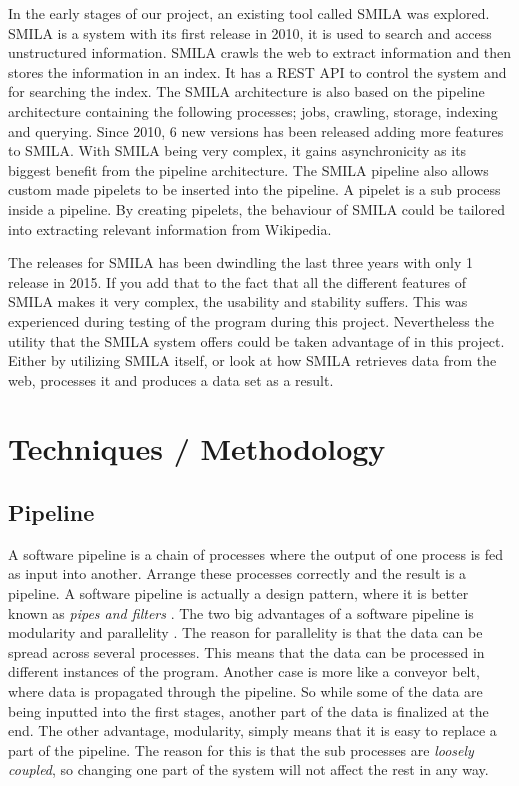 In the early stages of our project, an existing tool called SMILA \cite{smila} was explored. SMILA is a system with its first release in 2010, it is used to search and access unstructured information. SMILA crawls the web to extract information and then stores the information in an index. It has a REST API to control the system and for searching the index. The SMILA architecture is also based on the pipeline architecture containing the following processes; jobs, crawling, storage, indexing and querying. Since 2010, 6 new versions has been released adding more features to SMILA. With SMILA being very complex, it gains asynchronicity as its biggest benefit from the pipeline architecture. The SMILA pipeline also allows custom made pipelets to be inserted into the pipeline. A pipelet is a sub process inside a pipeline. By creating pipelets, the behaviour of SMILA could be tailored into extracting relevant information from Wikipedia.

The releases for SMILA has been dwindling the last three years with only 1 release in 2015. If you add that to the fact that all the different features of SMILA makes it very complex, the usability and stability suffers. This was experienced during testing of the program during this project.
Nevertheless the utility that the SMILA system offers could be taken advantage of in this project. Either by utilizing SMILA itself, or look at how SMILA retrieves data from the web, processes it and produces a data set as a result.


\section{Techniques / Methodology}

\subsection{Pipeline} \label{pipeline}

A software pipeline is a chain of processes where the output of one process is fed as input into another. Arrange these processes correctly and the result is a pipeline. A software pipeline is actually a design pattern, where it is better known as \textit{pipes and filters} \cite{pipes-and-filters}. The two big advantages of a software pipeline is modularity and parallelity \cite{dart}. The reason for parallelity is that the data can be spread across several processes. This means that the data can be processed in different instances of the program. Another case is more like a conveyor belt, where data is propagated through the pipeline. So while some of the data are being inputted into the first stages, another part of the data is finalized at the end. The other advantage, modularity, simply means that it is easy to replace a part of the pipeline. The reason for this is that the sub processes are \textit{loosely coupled}, so changing one part of the system will not affect the rest in any way.

